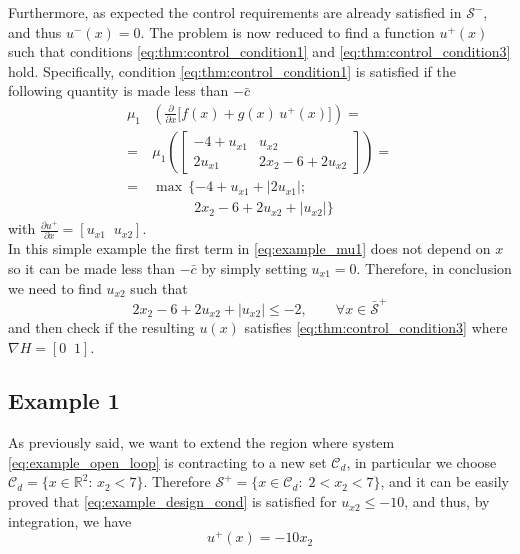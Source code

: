 \documentclass[letterpaper, 10 pt, conference]{ieeeconf}
\begin{document}
Furthermore, as expected the control requirements are already satisfied in $\mathcal{S}^-$, and thus $u^-(x)=0$. The problem is now reduced to find a function $u^+(x)$ such that conditions \eqref{eq:thm:control_condition1} and \eqref{eq:thm:control_condition3} hold. Specifically, condition \eqref{eq:thm:control_condition1} is satisfied if the following quantity is made less than $-\bar{c}$
\begin{equation}
\label{eq:example_mu1}
\begin{split}
\mu_1& \left(\frac{\partial}{\partial x}\big[ f(x)+g(x)\,u^+(x) \big] \right)=\\
=&\mu_1\left( 
\begin{bmatrix}
-4+u_{x1} & u_{x2}\\
2u_{x1} & 2x_2-6+2u_{x2}
\end{bmatrix} 
\right)=\\
=& \max\,\{ -4+u_{x1}+\lvert 2u_{x1} \rvert;\\
& \qquad \quad 2x_2-6+2u_{x2} +\lvert u_{x2}\rvert\}
\end{split}
\end{equation}
with $\frac{\partial u^+}{\partial x}=[u_{x1}\;\; u_{x2}]$.\\
In this simple example the first term in \eqref{eq:example_mu1} does not depend on $x$ so it can be made less than $-\bar{c}$ by simply setting $u_{x1}=0$. Therefore, in conclusion we need to find $u_{x2}$ such that
\begin{equation}
\label{eq:example_design_cond}
2x_2-6+2u_{x2}+|u_{x2}|\leq-2, \qquad \forall x\in\bar{\mathcal{S}}^+
\end{equation}
and then check if the resulting $u(x)$ satisfies \eqref{eq:thm:control_condition3} where $\nabla H=[0\;\; 1]$.

\subsection{Example 1}
\label{sec:example_1}
As previously said, we want to extend the region where system \eqref{eq:example_open_loop} is contracting to a new set $\mathcal{C}_d$, in particular we choose $\mathcal{C}_d=\{x\in\mathbb{R}^2:\, x_2<7\}$. Therefore $\mathcal{S}^+=\{x\in\mathcal{C}_d:\; 2<x_2<7\}$, and it can be easily proved that \eqref{eq:example_design_cond} is satisfied for $u_{x2}\leq-10$, and thus, by integration, we have 
\begin{equation*}
u^+(x)=-10x_2
\end{equation*}
\end{document}
